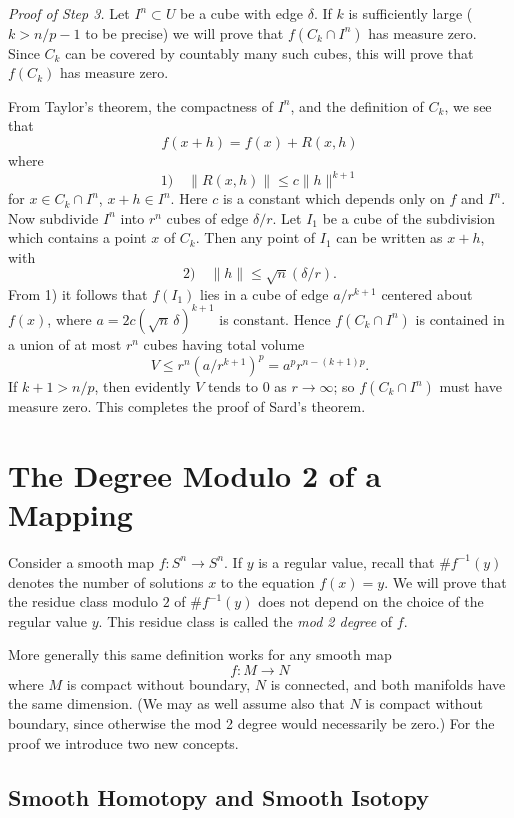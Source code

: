 
\noindent\textit{Proof of Step 3.}
Let $I^n \subset U$ be a cube with edge $\delta$. If $k$ is sufficiently large ($k > n/p - 1$ to be precise) we will prove that $f(C_k \cap I^n)$ has measure zero. Since $C_k$ can be covered by countably many such cubes, this will prove that $f(C_k)$ has measure zero.

From Taylor's theorem, the compactness of $I^n$, and the definition of $C_k$, we see that
\[
f(x + h) = f(x) + R(x, h)
\]
where
\[
\text{1)} \quad \|R(x, h)\| \leq c \|h\|^{k+1}
\]
for $x \in C_k \cap I^n$, $x + h \in I^n$. Here $c$ is a constant which depends only on $f$ and $I^n$. Now subdivide $I^n$ into $r^n$ cubes of edge $\delta/r$. Let $I_1$ be a cube of the subdivision which contains a point $x$ of $C_k$. Then any point of $I_1$ can be written as $x + h$, with
\[
\text{2)} \quad \|h\| \leq \sqrt{n}(\delta/r).
\]
From 1) it follows that $f(I_1)$ lies in a cube of edge $a/r^{k+1}$ centered about $f(x)$, where $a = 2c(\sqrt{n}\,\delta)^{k+1}$ is constant. Hence $f(C_k \cap I^n)$ is contained in a union of at most $r^n$ cubes having total volume
\[
V \leq r^n (a/r^{k+1})^p = a^p r^{n-(k+1)p}.
\]
If $k + 1 > n/p$, then evidently $V$ tends to $0$ as $r \to \infty$; so $f(C_k \cap I^n)$ must have measure zero. This completes the proof of Sard's theorem.



\section{The Degree Modulo 2 of a Mapping}

Consider a smooth map $f : S^n \to S^n$. If $y$ is a regular value, recall that $\#f^{-1}(y)$ denotes the number of solutions $x$ to the equation $f(x) = y$. We will prove that the residue class modulo $2$ of $\#f^{-1}(y)$ does not depend on the choice of the regular value $y$. This residue class is called the \emph{mod 2 degree} of $f$.

More generally this same definition works for any smooth map
\[
f : M \to N
\]
where $M$ is compact without boundary, $N$ is connected, and both manifolds have the same dimension. (We may as well assume also that $N$ is compact without boundary, since otherwise the mod 2 degree would necessarily be zero.) For the proof we introduce two new concepts.

\subsection{Smooth Homotopy and Smooth Isotopy}

